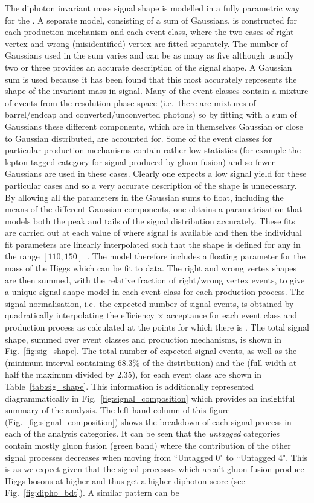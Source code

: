 The diphoton invariant mass signal shape is modelled in a fully parametric way for the \MFM. A separate model, consisting of a sum of Gaussians, is constructed for each production mechanism and each event class, where the two cases of right vertex and wrong (misidentified) vertex are fitted separately. The number of Gaussians used in the sum varies and can be as many as five although usually two or three provides an accurate description of the signal shape. A Gaussian sum is used because it has been found that this most accurately represents the shape of the invariant mass in signal. Many of the event classes contain a mixture of events from the resolution phase space (i.e.~there are mixtures of barrel/endcap and converted/unconverted photons) so by fitting with a sum of Gaussians these different components, which are in themselves Gaussian or close to Gaussian distributed, are accounted for. Some of the event classes for particular production mechanisms contain rather low \MC statistics (for example the lepton tagged category for signal produced by gluon fusion) and so fewer Gaussians are used in these cases. Clearly one expects a low signal yield for these particular cases and so a very accurate description of the shape is unnecessary. By allowing all the parameters in the Gaussian sums to float, including the means of the different Gaussian components, one obtains a parametrisation that models both the peak and tails of the signal distribution accurately. These fits are carried out at each value of \mH where signal \MC is available and then the individual fit parameters are linearly interpolated such that the shape is defined for any \mH in the range $[110,150]$~\GeV. The model therefore includes a floating parameter for the mass of the Higgs which can be fit to data. The right and wrong vertex shapes are then summed, with the relative fraction of right/wrong vertex events, to give a unique signal shape model in each event class for each production process. The signal normalisation, i.e.~the expected number of \SM signal events, is obtained by quadratically interpolating the efficiency $\times$ acceptance for each event class and production process as calculated at the \mH points for which there is \MC. The total signal shape, summed over event classes and production mechanisms, is shown in Fig.~\ref{fig:sig_shape}. The total number of expected signal events, as well as the \sigeff (minimum interval containing 68.3\% of the distribution) and the \sigFW (full width at half the maximum divided by 2.35), for each event class are shown in Table~\ref{tab:sig_shape}. This information is additionally represented diagrammatically in Fig.~\ref{fig:signal_composition} which provides an insightful summary of the analysis. The left hand column of this figure (Fig.~\ref{fig:signal_composition}) shows the breakdown of each signal process in each of the analysis categories. It can be seen that the \textit{untagged} categories contain mostly gluon fusion (green band) where the contribution of the other signal processes decreases when moving from ``Untagged 0" to ``Untagged 4". This is as we expect given that the signal processes which aren't gluon fusion produce Higgs bosons at higher \pT and thus get a higher diphoton \BDT score (see Fig.~\ref{fig:dipho_bdt}). A similar pattern can be 